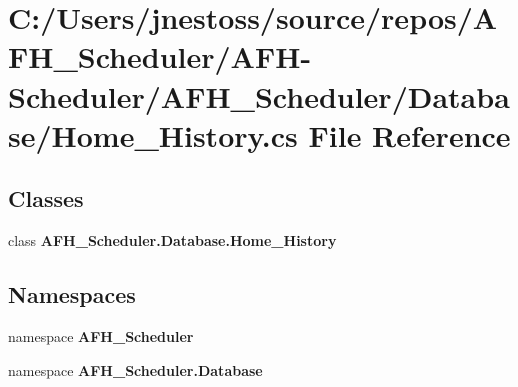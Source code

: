 \section{C\+:/\+Users/jnestoss/source/repos/\+A\+F\+H\+\_\+\+Scheduler/\+A\+F\+H-\/\+Scheduler/\+A\+F\+H\+\_\+\+Scheduler/\+Database/\+Home\+\_\+\+History.cs File Reference}
\label{_home___history_8cs}
\subsection*{Classes}
\begin{DoxyCompactItemize}
\item 
class \textbf{ A\+F\+H\+\_\+\+Scheduler.\+Database.\+Home\+\_\+\+History}
\end{DoxyCompactItemize}
\subsection*{Namespaces}
\begin{DoxyCompactItemize}
\item 
namespace \textbf{ A\+F\+H\+\_\+\+Scheduler}
\item 
namespace \textbf{ A\+F\+H\+\_\+\+Scheduler.\+Database}
\end{DoxyCompactItemize}
